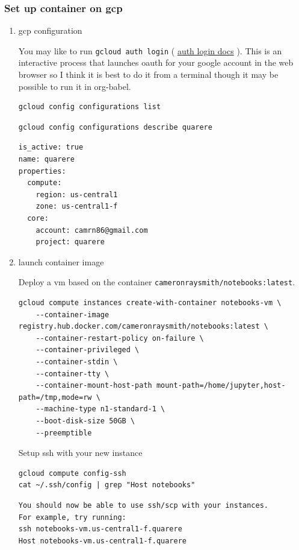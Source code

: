 \documentclass[11pt]{article}
\begin{document}
\subsubsection{Set up container on gcp}
\label{sec:org3c700fe}
\begin{enumerate}
\item gcp configuration
\label{sec:org9db9d7f}

You may like to run \texttt{gcloud auth login} ( \href{https://cloud.google.com/sdk/gcloud/reference/auth/login}{auth login docs} ). This is an interactive process that launches oauth for your google account in the web browser so I think it is best to do it from a terminal though it may be possible to run it in org-babel.

\begin{verbatim}
gcloud config configurations list
\end{verbatim}

\begin{verbatim}
gcloud config configurations describe quarere
\end{verbatim}

\begin{verbatim}
is_active: true
name: quarere
properties:
  compute:
    region: us-central1
    zone: us-central1-f
  core:
    account: camrn86@gmail.com
    project: quarere
\end{verbatim}

\item launch container image
\label{sec:org11236b9}

Deploy a vm based on the container \texttt{cameronraysmith/notebooks:latest}.

\begin{verbatim}
gcloud compute instances create-with-container notebooks-vm \
    --container-image registry.hub.docker.com/cameronraysmith/notebooks:latest \
    --container-restart-policy on-failure \
    --container-privileged \
    --container-stdin \
    --container-tty \
    --container-mount-host-path mount-path=/home/jupyter,host-path=/tmp,mode=rw \
    --machine-type n1-standard-1 \
    --boot-disk-size 50GB \
    --preemptible
\end{verbatim}

Setup ssh with your new instance

\begin{verbatim}
gcloud compute config-ssh
cat ~/.ssh/config | grep "Host notebooks"
\end{verbatim}

\begin{verbatim}
You should now be able to use ssh/scp with your instances.
For example, try running:
ssh notebooks-vm.us-central1-f.quarere
Host notebooks-vm.us-central1-f.quarere
\end{verbatim}



\end{enumerate}
\end{document}
